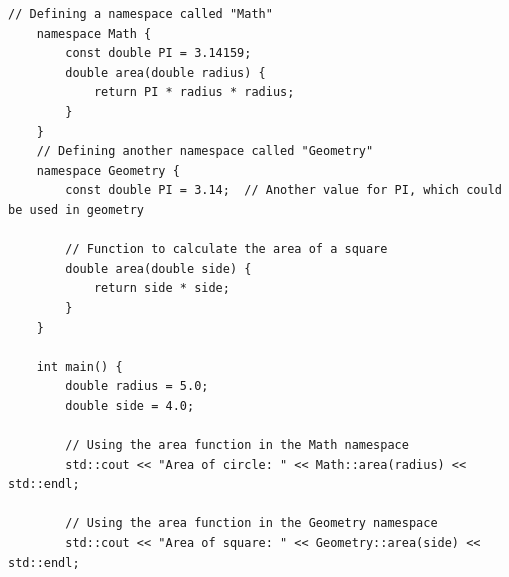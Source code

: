 \documentclass[12pt, a4paper]{report}
\begin{document}
\begin{enumerate}
\begin{lstlisting}[breaklines=true]
	// Defining a namespace called "Math"
	namespace Math {
		const double PI = 3.14159;
		double area(double radius) {
			return PI * radius * radius;
		}
	}
	// Defining another namespace called "Geometry"
	namespace Geometry {
		const double PI = 3.14;  // Another value for PI, which could be used in geometry
		
		// Function to calculate the area of a square
		double area(double side) {
			return side * side;
		}
	}
	
	int main() {
		double radius = 5.0;
		double side = 4.0;
		
		// Using the area function in the Math namespace
		std::cout << "Area of circle: " << Math::area(radius) << std::endl;
		
		// Using the area function in the Geometry namespace
		std::cout << "Area of square: " << Geometry::area(side) << std::endl;
		

\end{lstlisting}
\end{enumerate}
\end{document}
